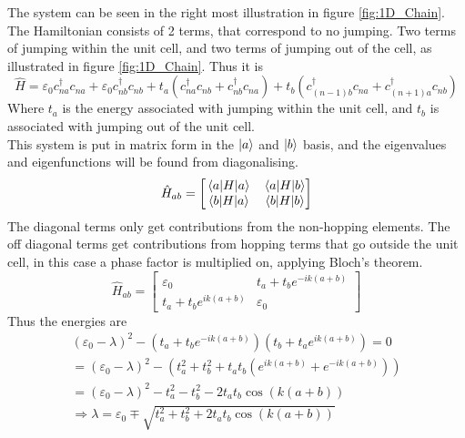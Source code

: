 \begin{solution}
The system can be seen in the right most illustration in figure \ref{fig:1D_Chain}.
The Hamiltonian consists of 2 terms, that correspond to no jumping. Two terms of jumping within the unit cell, and two terms of jumping out of the cell, as illustrated in figure \ref{fig:1D_Chain}. Thus it is
\begin{equation}
    \hat{H} = \varepsilon_0 c_{na}^{\dagger}c_{na} + \varepsilon_0 c_{nb}^{\dagger}c_{nb} + t_a (c_{na}^{\dagger} c_{nb} + c_{nb}^{\dagger} c_{na} ) + t_b (  c_{(n-1)b}^{\dagger} c_{na} + c_{(n+1)a}^{\dagger} c_{nb})
\end{equation}
Where $t_a$ is the energy associated with jumping within the unit cell, and $t_b$ is associated with jumping out of the unit cell. \\
This system is put in matrix form in the $|a\rangle$ and $|b\rangle$ basis, and the eigenvalues and eigenfunctions will be found from diagonalising.
\begin{equation}
    \hat{H}_{ab} =
    \begin{bmatrix}
    \mel{a}{H}{a} & \mel{a}{H}{b} \\
    \mel{b}{H}{a} & \mel{b}{H}{b}
    \end{bmatrix}
\end{equation}
The diagonal terms only get contributions from the non-hopping elements. The off diagonal terms get contributions from hopping terms that go outside the unit cell, in this case a phase factor is multiplied on, applying Bloch's theorem.
\begin{equation}
    \hat{H}_{ab} =
    \begin{bmatrix}
    \varepsilon_0 & t_a + t_b e^{-ik(a+b)} \\
    t_a + t_b e^{ik(a+b)} & \varepsilon_0
    \end{bmatrix}
\end{equation}
Thus the energies are
\begin{equation}
\begin{split}
    (\varepsilon_0 - \lambda)^2 - (t_a + t_b e^{-ik(a+b)})(t_b + t_a e^{ik(a+b)}) = 0 \\ = (\varepsilon_0 - \lambda)^2 - (t_a^2 + t_b^2 + t_a t_b (e^{ik(a+b)} + e^{-ik(a+b)})) \\ = (\varepsilon_0 - \lambda)^2 - t_a^2 - t_b^2 - 2 t_a t_b \cos(k(a+b)) \\
    \Rightarrow \lambda =  \varepsilon_0 \mp \sqrt{ t_a^2 + t_b^2 + 2 t_a t_b \cos(k(a+b))}
\end{split}
\end{equation}




\end{solution}
